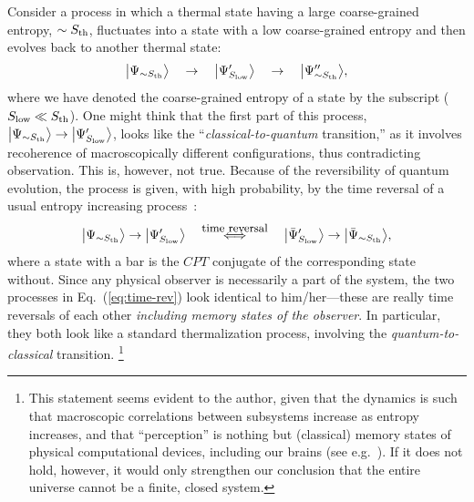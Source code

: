 \documentclass[12pt]{article}
\begin{document}
Consider a process in which a thermal state having a large coarse-grained 
entropy, $\sim S_{\rm th}$, fluctuates into a state with a low 
coarse-grained entropy and then evolves back to another thermal state:
%
\begin{equation}
  \bigl|\Psi_{\sim S_{\rm th}}\bigr>
\quad\rightarrow\quad
  \bigl|\Psi'_{S_{\rm low}}\bigr>
\quad\rightarrow\quad
  \bigl|\Psi''_{\sim S_{\rm th}}\bigr>,
\label{eq:fluctuate}
\end{equation}
%
where we have denoted the coarse-grained entropy of a state by the 
subscript ($S_{\rm low} \ll S_{\rm th}$).  One might think that the first 
part of this process, $\bigl|\Psi_{\sim S_{\rm th}}\bigr> \rightarrow 
\bigl|\Psi'_{S_{\rm low}}\bigr>$, looks like the ``{\it classical-to-quantum} 
transition,'' as it involves recoherence of macroscopically different 
configurations, thus contradicting observation.  This is, however, not 
true.  Because of the reversibility of quantum evolution, the process 
is given, with high probability, by the time reversal of a usual entropy 
increasing process~\cite{Aguirre:2011ac}:
%
\begin{equation}
  \bigl|\Psi_{\sim S_{\rm th}}\bigr> \rightarrow 
    \bigl|\Psi'_{S_{\rm low}}\bigr>
\quad\stackrel{\mbox{\footnotesize time reversal}}{\Longleftrightarrow}\quad
  \bigl|\bar{\Psi}'_{S_{\rm low}}\bigr> 
    \rightarrow \bigl|\bar{\Psi}_{\sim S_{\rm th}}\bigr>,
\label{eq:time-rev}
\end{equation}
%
where a state with a bar is the $CPT$ conjugate of the corresponding 
state without.  Since any physical observer is necessarily a part of 
the system, the two processes in Eq.~(\ref{eq:time-rev}) look identical 
to him/her---these are really time reversals of each other {\it including 
memory states of the observer}.  In particular, they both look like 
a standard thermalization process, involving the {\it quantum-to-classical} 
transition.%
\footnote{This statement seems evident to the author, given that the 
 dynamics is such that macroscopic correlations between subsystems increase 
 as entropy increases, and that ``perception'' is nothing but (classical) 
 memory states of physical computational devices, including our brains 
 (see e.g.~\cite{Schulman:2005}).  If it does not hold, however, it 
 would only strengthen our conclusion that the entire universe cannot 
 be a finite, closed system.}
\end{document}
